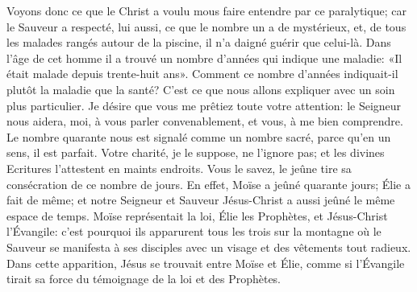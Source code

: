Voyons donc ce que le Christ a voulu mous faire entendre par ce paralytique;
	car le Sauveur a respecté, lui aussi, ce que le nombre un a de mystérieux,
	et, de tous les malades rangés autour de la piscine,
	il n’a daigné guérir que celui-là.
Dans l’âge de cet homme il a trouvé un nombre d’années qui indique une maladie:
	«Il était malade depuis trente-huit ans».
Comment ce nombre d’années indiquait-il plutôt la maladie que la santé?
C’est ce que nous allons expliquer avec un soin plus particulier.
Je désire que vous me prêtiez toute votre attention:
	le Seigneur nous aidera, moi, à vous parler convenablement,
	et vous, à me bien comprendre.
Le nombre quarante nous est signalé comme un nombre sacré,
	parce qu’en un sens, il est parfait.
Votre charité, je le suppose, ne l’ignore pas;
	et les divines Ecritures l’attestent en maints endroits.
Vous le savez, le jeûne tire sa consécration de ce nombre de jours.
En effet, Moïse a jeûné quarante jours;
	Élie a fait de même;
	et notre Seigneur et Sauveur Jésus-Christ a aussi jeûné le même espace de temps.
Moïse représentait la loi, Élie les Prophètes, et Jésus-Christ l’Évangile:
	c’est pourquoi ils apparurent tous les trois
		sur la montagne où le Sauveur se manifesta à ses disciples
		avec un visage et des vêtements tout radieux.
Dans cette apparition, Jésus se trouvait entre Moïse et Élie,
	comme si l’Évangile tirait sa force du témoignage de la loi et des Prophètes.
